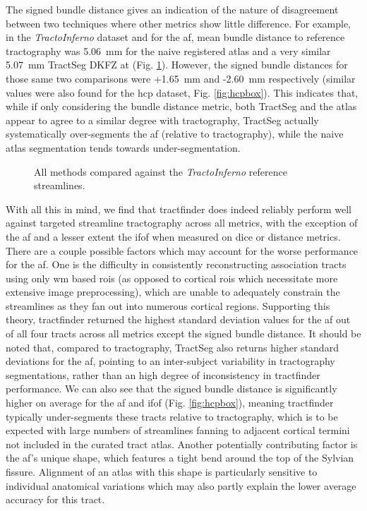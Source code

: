 The signed bundle distance gives an indication of the nature of disagreement between two techniques where other metrics show little difference.
For example, in the \textit{TractoInferno} dataset and for the \gls{af}, mean bundle distance to reference tractography was 5.06~mm for the naive registered atlas and a very similar 5.07~mm TractSeg DKFZ at (Fig. \ref{fig:combobox}). %
However, the signed bundle distances for those same two comparisons were +1.65~mm and -2.60~mm respectively (similar values were also found for the \gls{hcp} dataset, Fig. \ref{fig:hcpbox}).
This indicates that, while if only considering the bundle distance metric, both TractSeg and the atlas appear to agree to a similar degree with tractography, TractSeg actually systematically over-segments the \gls{af} (relative to tractography), while the naive atlas segmentation tends towards under-segmentation.

\begin{figure}[h!]
  \centering
  \caption[Comparison results with \textit{TractoInferno} reference streamlines]{All methods compared against the \textit{TractoInferno} reference streamlines. }
  \label{fig:combobox}
\end{figure}

With all this in mind, we find that tractfinder does indeed reliably perform well against targeted streamline tractography across all metrics, with the exception of the \gls{af} and a lesser extent the \gls{ifof} when measured on \gls{dice} or distance metrics.
There are a couple possible factors which may account for the worse performance for the \gls{af}.
One is the difficulty in consistently reconstructing association tracts using only \gls{wm} based \glspl{roi} (as opposed to cortical \glspl{roi} which necessitate more extensive image preprocessing), which are unable to adequately constrain the streamlines as they fan out into numerous cortical regions.
Supporting this theory, tractfinder returned the highest standard deviation values for the \gls{af} out of all four tracts across all metrics except the signed bundle distance.
It should be noted that, compared to tractography, TractSeg also returns higher standard deviations for the \gls{af}, pointing to an inter-subject variability in tractography segmentations, rather than an high degree of inconsistency in tractfinder performance.
We can also see that the signed bundle distance is significantly higher on average for the \gls{af} and \gls{ifof} (Fig. \ref{fig:hcpbox}), meaning tractfinder typically under-segments these tracts relative to tractography, which is to be expected with large numbers of streamlines fanning to adjacent cortical termini not included in the curated tract atlas.
Another potentially contributing factor is the \gls{af}'s unique shape, which features a tight bend around the top of the Sylvian fissure.
Alignment of an atlas with this shape is particularly sensitive to individual anatomical variations which may also partly explain the lower average accuracy for this tract.

